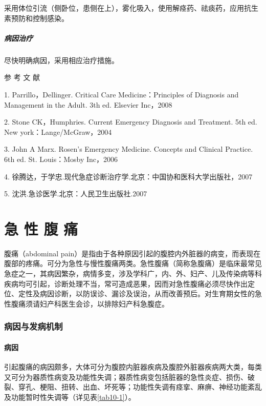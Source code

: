 采用体位引流（侧卧位，患侧在上），雾化吸入，使用解痉药、祛痰药，应用抗生素预防和控制感染。

\paragraph{病因治疗}

尽快明确病因，采用相应治疗措施。

\protect\hypertarget{text00025.html}{}{}

\hypertarget{text00025.htmlux5cux23CHP1-9-5}{}
参 考 文 献

1. Parrillo，Dellinger. Critical Care Medicine：Principles of Diagnosis
and Management in the Adult. 3th ed. Elsevier Inc，2008

2. Stone CK，Humphries. Current Emergency Diagnosis and Treatment. 5th
ed. New york：Lange/McGraw，2004

3. John A Marx. Rosen's Emergency Medicine. Concepts and Clinical
Practice. 6th ed. St. Louis：Mosby Inc，2006

4. 徐腾达，于学忠.现代急症诊断治疗学.北京：中国协和医科大学出版社，2007

5. 沈洪.急诊医学.北京：人民卫生出版社.2007

\protect\hypertarget{text00026.html}{}{}

\chapter{急 性 腹 痛}

腹痛（abdominal
pain）是指由于各种原因引起的腹腔内外脏器的病变，而表现在腹部的疼痛。可分为急性与慢性腹痛两类。急性腹痛（简称急腹痛）是临床最常见急症之一，其病因繁杂，病情多变，涉及学科广，内、外、妇产、儿及传染病等科疾病均可引起，诊断处理不当，常可造成恶果，因而对急性腹痛必须尽快作出定位、定性及病因诊断，以防误诊、漏诊及误治，从而改善预后。对生育期女性的急性腹痛须请妇产科医生会诊，以排除妇产科急腹症。

\subsection{病因与发病机制}

\subsubsection{病因}

引起腹痛的病因颇多，大体可分为腹腔内脏器疾病及腹腔外脏器疾病两大类，每类又可分为器质性病变及功能性失调；器质性病变包括脏器的急性炎症、损伤、破裂、穿孔、梗阻、扭转、出血、坏死等；功能性失调有痉挛、麻痹、神经功能紊乱及功能暂时性失调等（详见表\ref{tab10-1}）。

